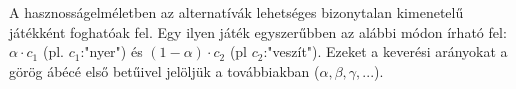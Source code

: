 \documentclass[a4paper,12pt]{article}
\begin{document}




A hasznosságelméletben az alternatívák lehetséges bizonytalan kimenetelű játékként foghatóak fel. Egy ilyen játék egyszerűbben az alábbi módon írható fel: $\alpha \cdot c_1$ (pl. $c_1$:"nyer") és $(1-\alpha) \cdot c_2$ (pl $c_2$:"veszít"). Ezeket a keverési arányokat a görög ábécé első betűivel jelöljük a továbbiakban ($\alpha, \beta, \gamma, ...$).
\end{document}

